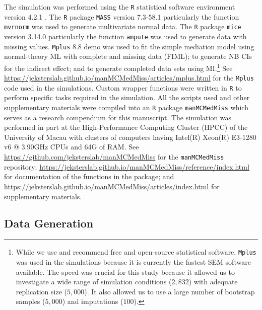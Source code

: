 \documentclass[man]{apa7}\usepackage[]{graphicx}\usepackage[]{xcolor}
\begin{document}
The simulation was performed using the
\texttt{R}
statistical software environment version 4.2.1
\parencite{Lib-R-Manual-2022}.
The \texttt{R} package \texttt{MASS}
\parencite{Lib-R-Packages-MASS-2002}
version 7.3-58.1 particularly the function
\texttt{mvrnorm}
was used to generate multivariate normal data.
The \texttt{R} package
\texttt{mice}
\parencite{Lib-R-Packages-mice-2011}
version 3.14.0 particularly the function
\texttt{ampute}
was used to generate data with missing values.
\texttt{Mplus}
8.8 demo
\parencite{Lib-Structural-Equation-Modeling-Software-Manuals-Muthen-2017}
was used to fit the simple mediation model using normal-theory ML with complete and missing data (FIML);
to generate NB CIs for the indirect effect;
and to generate completed data sets using MI.\footnote{While we use and recommend free and open-source statistical software, \texttt{Mplus} was used in the simulations because it is currently the fastest SEM software available. The speed was crucial for this study because it allowed us to investigate a wide range of simulation conditions ($2,832$) with adequate replication size ($5,000$). It also allowed us to use a large number of bootstrap samples ($5,000$) and imputations ($100$).}
See \url{https://jeksterslab.github.io/manMCMedMiss/articles/mplus.html} for the \texttt{Mplus} code used in the simulations.
Custom wrapper functions were written in \texttt{R} to perform specific tasks required in the simulation.
All the scripts used and other supplementary materials
were compiled into an \texttt{R} package \texttt{manMCMedMiss}
which serves as a research compendium for this manuscript.
The simulation was performed in part at the High-Performance Computing Cluster (HPCC) of the University of Macau with clusters of computers having Intel(R) Xeon(R) E3-1280 v6 @ 3.90GHz CPUs and 64G of RAM. See \url{https://github.com/jeksterslab/manMCMedMiss} for the \texttt{manMCMedMiss} repository;
\url{https://jeksterslab.github.io/manMCMedMiss/reference/index.html} for documentation of the functions in the package;
and
\url{https://jeksterslab.github.io/manMCMedMiss/articles/index.html}
for supplementary materials.

\subsection{Data Generation}
\end{document}
